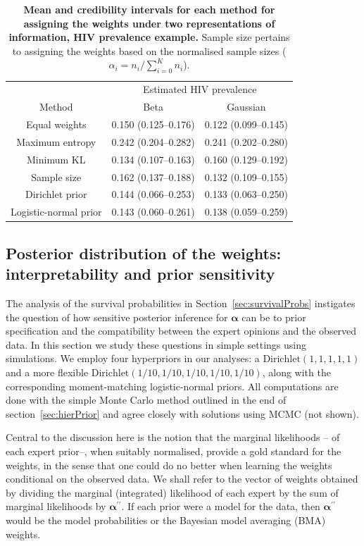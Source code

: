 \documentclass[12pt]{article}
\begin{document}
\begin{table}[ht]
\caption{\textbf{Mean and credibility intervals for each method for assigning the weights under two representations of information, HIV prevalence example.}
Sample size pertains to assigning the  weights based on the normalised sample sizes ($\alpha_i = n_i/ \sum_{i =0}^K n_i$).
}
\centering
\begin{tabular}{ccc}
 \hline
 & \multicolumn{2}{c}{Estimated HIV prevalence} \\
Method & Beta & Gaussian  \\ 
 \hline
 Equal weights &  0.150 (0.125--0.176)&  0.122 (0.099--0.145)\\ 
 Maximum entropy & 0.242 (0.204--0.282)  &  0.241 (0.202--0.280)\\ 
 Minimum KL  & 0.134 (0.107--0.163)  & 0.160 (0.129--0.192) \\ 
 Sample size & 0.162 (0.137--0.188) & 0.132 (0.109--0.155)\\
 Dirichlet prior & 0.144 (0.066--0.253) &  0.133 (0.063--0.250)\\ 
 Logistic-normal prior  & 0.143 (0.060--0.261) & 0.138 (0.059--0.259)\\ 
  \hline
\end{tabular}
\label{tab:prior_MSM}
\end{table}

\subsection{Posterior distribution of the weights: interpretability and prior sensitivity}
\label{sec:learning_rate}

The analysis of the survival probabilities in Section~\ref{sec:survivalProbs} instigates the question of how sensitive posterior inference for $\boldsymbol \alpha$ can be to prior specification and the compatibility between the expert opinions and the observed data.
In this section we study these questions in simple settings using simulations.
We employ four hyperpriors in our analyses: a $\text{Dirichlet}(1, 1, 1, 1, 1)$ and a more flexible $\text{Dirichlet}(1/10, 1/10, 1/10, 1/10, 1/10)$, along with the corresponding moment-matching logistic-normal priors.
All computations are done with the simple Monte Carlo method outlined in the end of section~\ref{sec:hierPrior} and agree closely with solutions using MCMC (not shown).

Central to the discussion here is the notion that the marginal likelihoods -- of each expert prior--, when suitably normalised, provide a gold standard for the weights, in the sense that one could do no better when learning the weights conditional on the observed data.
We shall refer to the vector of weights obtained by dividing the marginal (integrated) likelihood of each expert by the sum of marginal likelihoods by $\boldsymbol\alpha^{\prime\prime}$.
If each prior were a model for the data, then $\boldsymbol\alpha^{\prime\prime}$ would be the model probabilities or the Bayesian model averaging (BMA) weights.
\end{document}

